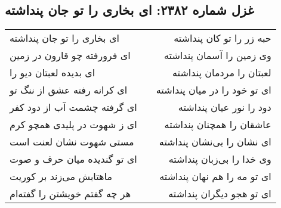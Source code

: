 \begin{center}
\section*{غزل شماره ۲۳۸۲: ای بخاری را تو جان پنداشته}
\label{sec:2382}
\begin{longtable}{l p{0.5cm} r}
ای بخاری را تو جان پنداشته
&&
حبه زر را تو کان پنداشته
\\
ای فرورفته چو قارون در زمین
&&
وی زمین را آسمان پنداشته
\\
ای بدیده لعبتان دیو را
&&
لعبتان را مردمان پنداشته
\\
ای کرانه رفته عشق از ننگ تو
&&
ای تو خود را در میان پنداشته
\\
ای گرفته چشمت آب از دود کفر
&&
دود را نور عیان پنداشته
\\
ای ز شهوت در پلیدی همچو کرم
&&
عاشقان را همچنان پنداشته
\\
مستی شهوت نشان لعنت است
&&
ای نشان را بی‌نشان پنداشته
\\
ای تو گندیده میان حرف و صوت
&&
وی خدا را بی‌زبان پنداشته
\\
ماهتابش می‌زند بر کوریت
&&
ای تو مه را هم نهان پنداشته
\\
هر چه گفتم خویشتن را گفته‌ام
&&
ای تو هجو دیگران پنداشته
\\
\end{longtable}
\end{center}
